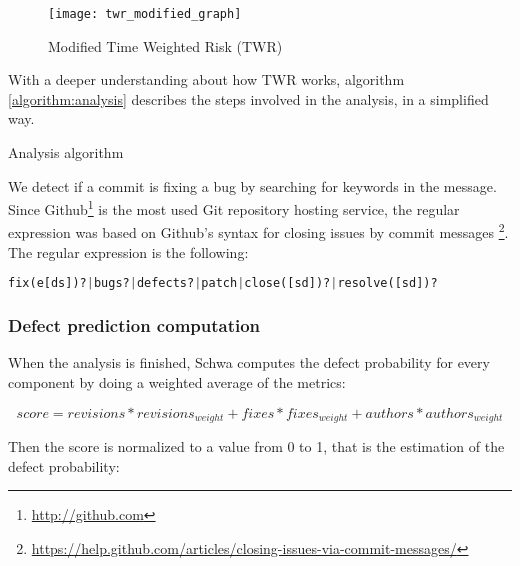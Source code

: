\begin{figure}[!ht]
    \begin{center}
        \texttt{[image: twr\_modified\_graph]}
        \caption{Modified Time Weighted Risk (TWR)}
        \label{figure:twr_modified_graph}
    \end{center}
\end{figure}

With a deeper understanding about how TWR works, algorithm \ref{algorithm:analysis} describes the steps involved in the analysis, in a simplified way.\*

\begin{algorithm}[H]
\caption{Analysis algorithm}
\label{algorithm:analysis}
\end{algorithm}

We detect if a commit is fixing a bug by searching for keywords in the message. Since Github\footnote{\url{http://github.com}} is the most used Git repository hosting service, the regular expression was based on Github's syntax for closing issues by commit messages \footnote{\url{https://help.github.com/articles/closing-issues-via-commit-messages/}}. The regular expression is the following:

\begin{lstlisting}[language=python, caption=Bug-fixing message regular expression]
fix(e[ds])?|bugs?|defects?|patch|close([sd])?|resolve([sd])?
\end{lstlisting}

\subsubsection{Defect prediction computation}
When the analysis is finished, Schwa computes the defect probability for every component by doing a weighted average of the metrics: 

\begin{equation}
score = revisions * revisions_{weight} + fixes * fixes_{weight} + authors * authors_{weight}
\end{equation}

Then the score is normalized to a value from 0 to 1, that is the estimation of the defect probability:

